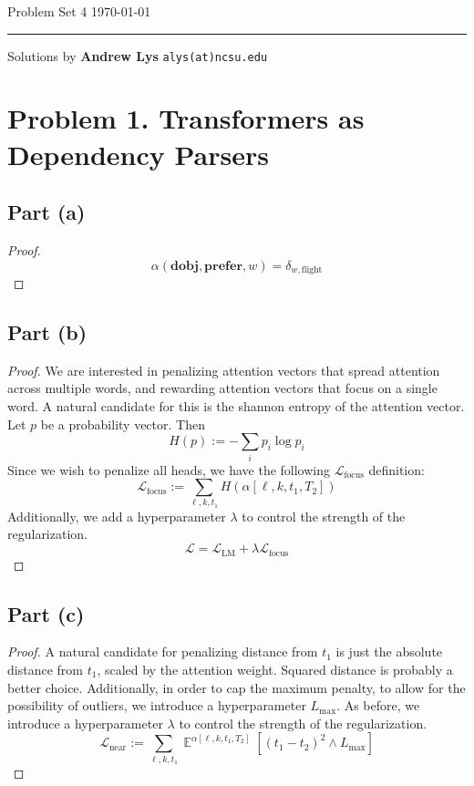 \documentclass{amsart}
\newcommand{\cL}{\mathcal{L}}
\DeclareMathOperator{\ee}{\mathbb{E}}
\theoremstyle{definition}
\begin{document}
\noindent
Problem Set 4  \hfill \today  %
\smallskip
\hrule
\smallskip
\noindent
Solutions by {\bf Andrew Lys} \qquad   %
  {\tt alys(at)ncsu.edu}

\vspace{0.5cm}
\section*{Problem 1. Transformers as Dependency Parsers}
\subsection*{Part (a)} 
\begin{proof}
    \[
    \alpha(\mathbf{dobj}, \mathbf{prefer}, w) = \delta_{w, \text{flight}}
    \]
\end{proof}
\subsection*{Part (b)}
\begin{proof}
    We are interested in penalizing attention vectors that spread attention across multiple words, 
    and rewarding attention vectors that focus on a single word. 
    A natural candidate for this is the shannon entropy of the attention vector. Let $p$ be a probability vector. Then
    \[
    H(p) := -\sum_{i} p_i \log p_i
    \] 
    Since we wish to penalize all heads, we have the following $\cL_{\text{focus}}$ definition:
    \[
    \cL_{\text{focus}} := \sum_{\ell, k, t_1} H(\alpha[\ell, k, t_1, T_2])
    \]
    Additionally, we add a hyperparameter $\lambda$ to control the strength of the regularization.
    \[
    \cL = \cL_{\text{LM}} + \lambda \cL_{\text{focus}}
    \]
\end{proof}

\subsection*{Part (c)}
\begin{proof}
    A natural candidate for penalizing distance from $t_1$ is just the absolute distance from $t_1$, scaled by the attention weight. 
    Squared distance is probably a better choice. 
    Additionally, in order to cap the maximum penalty, to allow for the possibility of outliers, we introduce a hyperparameter $L_{\text{max}}$.
    As before, we introduce a hyperparameter $\lambda$ to control the strength of the regularization.
    \[
    \cL_{\text{near}} := \sum_{\ell, k, t_1} \ee^{\alpha[\ell, k, t_1, T_2]}[(t_1 - t_2)^2 \land L_{\text{max}}]
    \]
\end{proof}
\end{document}

